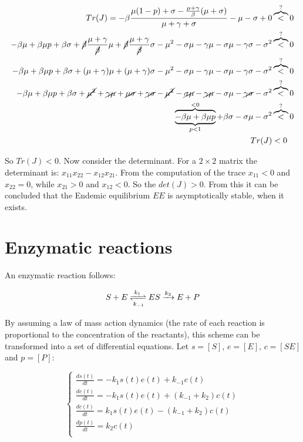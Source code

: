   \begin{align*}
    Tr(J) = -\beta\frac{\mu(1-p) + \sigma - \frac{\mu+\gamma}{\beta}(\mu+\sigma)}{\mu + \gamma+ \sigma} -\mu - \sigma + 0 &\overbrace{<}^{?} 0\\
    -\beta\mu +\beta\mu p + \beta\sigma + \cancel{\beta}\frac{\mu+\gamma}{\cancel{\beta}}\mu+\cancel{\beta}\frac{\mu+\gamma}{\cancel{\beta}}\sigma -\mu^2 - \sigma\mu-\gamma\mu - \sigma\mu-\gamma\sigma-\sigma^2 &\overbrace{<}^{?} 0\\
    -\beta\mu +\beta\mu p + \beta\sigma + (\mu+\gamma)\mu+(\mu+\gamma)\sigma -\mu^2 - \sigma\mu-\gamma\mu - \sigma\mu-\gamma\sigma-\sigma^2 &\overbrace{<}^{?} 0\\
    -\beta\mu +\beta\mu p + \beta\sigma + \cancel{\mu^2}+\cancel{\gamma\mu}+\cancel{\mu\sigma}+\cancel{\gamma\sigma} -\cancel{\mu^2} - \cancel{\sigma\mu}-\cancel{\gamma\mu} - \sigma\mu-\cancel{\gamma\sigma}-\sigma^2 &\overbrace{<}^{?} 0\\
    \overbrace{\underbrace{-\beta\mu +\beta\mu p}_{p<1}}^{<0} + \beta\sigma - \sigma\mu-\sigma^2 &\overbrace{<}^{?} 0\\
    Tr(J) &< 0\\
  \end{align*}

  So $Tr(J) < 0$.
  Now consider the determinant.
  For a $2\times 2$ matrix the determinant is: $x_{11}x_{22}-x_{12}x_{21}$.
  From the computation of the trace $x_{11} < 0$ and $x_{22} = 0$, while $x_{21} > 0$ and $x_{12} < 0$.
  So the $det(J) > 0$.
  From this it can be concluded that the Endemic equilibrium $EE$ is asymptotically stable, when it exists.

\section{Enzymatic reactions}
An enzymatic reaction follows:

$$S + E \xrightleftharpoons[k_{-1}]{k_1} ES \xrightarrow{k_2} E + P$$

By assuming a law of mass action dynamics (the rate of each reaction is proportional to the concentration of the reactants), this scheme can be transformed into a set of differential equations.
Let $s = [S]$, $e = [E]$, $c = [SE]$ and $p = [P]$:

$$\begin{cases}
  \frac{ds(t)}{dt} = -k_1s(t)e(t) + k_{-1}c(t)\\
  \frac{de(t)}{dt} = -k_1s(t)e(t) + (k_{-1}+k_2)c(t)\\
  \frac{dc(t)}{dt} = k_1s(t)e(t) - (k_{-1}+k_2)c(t)\\
  \frac{dp(t)}{dt} = k_2c(t)\\
\end{cases}$$


